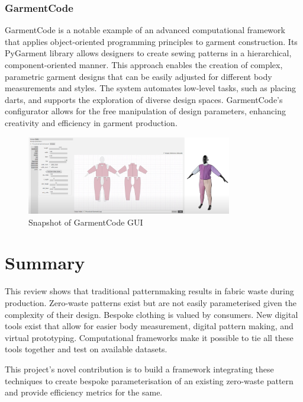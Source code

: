 \subsubsection{GarmentCode}
GarmentCode is a notable example of an advanced computational framework that applies object-oriented programming principles to garment construction. Its PyGarment library allows designers to create sewing patterns in a hierarchical, component-oriented manner. This approach enables the creation of complex, parametric garment designs that can be easily adjusted for different body measurements and styles. The system automates low-level tasks, such as placing darts, and supports the exploration of diverse design spaces. GarmentCode's configurator allows for the free manipulation of design parameters, enhancing creativity and efficiency in garment production.
\begin{figure} [H]
    \centering
    \includegraphics[width=0.8\textwidth]{Images/pygarment.png}
    \caption{Snapshot of GarmentCode GUI}
\end{figure}

\section{Summary}
This review shows that traditional patternmaking results in fabric waste during production. Zero-waste patterns exist but are not easily parameterised given the complexity of their design. Bespoke clothing is valued by consumers. New digital tools exist that allow for easier body measurement, digital pattern making, and virtual prototyping. Computational frameworks make it possible to tie all these tools together and test on available datasets.

This project's novel contribution is to build a framework integrating these techniques to create bespoke parameterisation of an existing zero-waste pattern and provide efficiency metrics for the same.